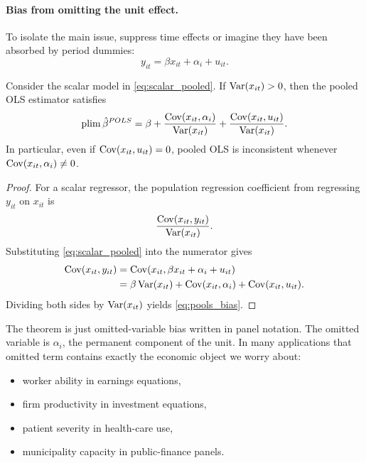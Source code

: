 \paragraph{Bias from omitting the unit effect.}
To isolate the main issue, suppress time effects or imagine they have been absorbed by period dummies:
\begin{equation}
y_{it} = \beta x_{it} + \alpha_i + u_{it}.
\label{eq:scalar_pooled}
\end{equation}

\begin{thmN}
Consider the scalar model in \eqref{eq:scalar_pooled}. If $\operatorname{Var}(x_{it})>0$, then the pooled \ac{OLS} estimator satisfies
\begin{equation}
\operatorname*{plim} \hat{\beta}^{POLS}
= \beta + \frac{\operatorname{Cov}(x_{it},\alpha_i)}{\operatorname{Var}(x_{it})}
      + \frac{\operatorname{Cov}(x_{it},u_{it})}{\operatorname{Var}(x_{it})}.
\label{eq:pools_bias}
\end{equation}
In particular, even if $\operatorname{Cov}(x_{it},u_{it})=0$, pooled \ac{OLS} is inconsistent whenever $\operatorname{Cov}(x_{it},\alpha_i)\neq 0$.
\end{thmN}

\begin{proof}
For a scalar regressor, the population regression coefficient from regressing $y_{it}$ on $x_{it}$ is
\[
\frac{\operatorname{Cov}(x_{it},y_{it})}{\operatorname{Var}(x_{it})}.
\]
Substituting \eqref{eq:scalar_pooled} into the numerator gives
\begin{align*}
\operatorname{Cov}(x_{it},y_{it})
&= \operatorname{Cov}(x_{it},\beta x_{it}+\alpha_i+u_{it}) \\
&= \beta \operatorname{Var}(x_{it}) + \operatorname{Cov}(x_{it},\alpha_i) + \operatorname{Cov}(x_{it},u_{it}).
\end{align*}
Dividing both sides by $\operatorname{Var}(x_{it})$ yields \eqref{eq:pools_bias}.
\end{proof}

The theorem is just omitted-variable bias written in panel notation. The omitted variable is $\alpha_i$, the permanent component of the unit. In many applications that omitted term contains exactly the economic object we worry about:
\begin{itemize}
\item worker ability in earnings equations,
\item firm productivity in investment equations,
\item patient severity in health-care use,
\item municipality capacity in public-finance panels.
\end{itemize}

